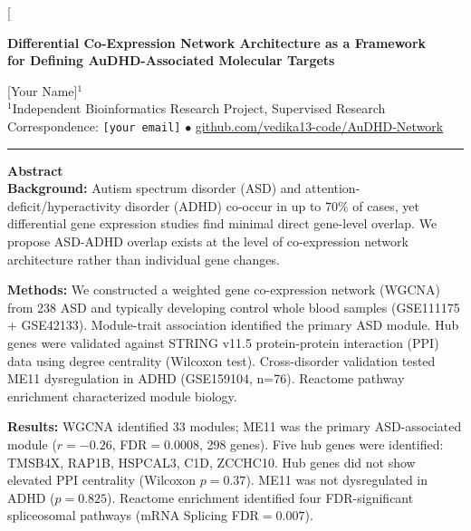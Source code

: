 \documentclass[10pt,twocolumn]{article}
\begin{document}
\twocolumn[{%
\begin{@twocolumnfalse}

\begin{center}
  {\LARGE\bfseries\color{navy}
    Differential Co-Expression Network Architecture as a Framework\\
    for Defining AuDHD-Associated Molecular Targets
  \par}
  \vspace{0.5em}

  {\large [Your Name]$^{1}$}\\[0.3em]
  {\small\color{textgrey}
    $^{1}$Independent Bioinformatics Research Project, Supervised Research\\
    Correspondence: \texttt{[your email]} $\bullet$
    \url{github.com/vedika13-code/AuDHD-Network}
  }

  \vspace{0.8em}
  \noindent\color{navy}\rule{\linewidth}{1.5pt}
  \vspace{0.5em}
\end{center}

\begin{mdframed}[
  backgroundcolor=lgrey,
  linecolor=navy,
  linewidth=1pt,
  innertopmargin=8pt,
  innerbottommargin=8pt,
  innerleftmargin=10pt,
  innerrightmargin=10pt
]
{\color{navy}\bfseries Abstract}\\[4pt]
\small
\textbf{Background:} Autism spectrum disorder (ASD) and attention-deficit/hyperactivity
disorder (ADHD) co-occur in up to 70\% of cases, yet differential gene expression studies
find minimal direct gene-level overlap. We propose ASD-ADHD overlap exists at the level of
co-expression network architecture rather than individual gene changes.

\medskip
\textbf{Methods:} We constructed a weighted gene co-expression network (WGCNA) from 238
ASD and typically developing control whole blood samples (GSE111175 + GSE42133). Module-trait
association identified the primary ASD module. Hub genes were validated against STRING v11.5
protein-protein interaction (PPI) data using degree centrality (Wilcoxon test). Cross-disorder
validation tested ME11 dysregulation in ADHD (GSE159104, n=76). Reactome pathway enrichment
characterized module biology.

\medskip
\textbf{Results:} WGCNA identified 33 modules; ME11 was the primary ASD-associated module
($r=-0.26$, FDR$=0.0008$, 298 genes). Five hub genes were identified: TMSB4X, RAP1B, HSPCAL3,
C1D, ZCCHC10. Hub genes did not show elevated PPI centrality (Wilcoxon $p=0.37$). ME11 was
not dysregulated in ADHD ($p=0.825$). Reactome enrichment identified four FDR-significant
spliceosomal pathways (mRNA Splicing FDR$=0.007$).


\end{mdframed}
\end{@twocolumnfalse}}
\end{document}
